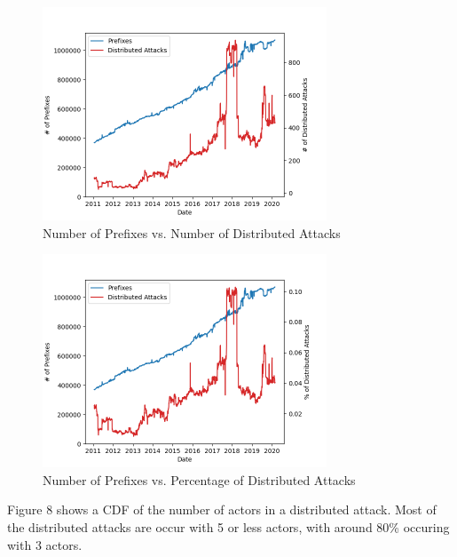 \begin{figure}[tp]
    \begin{center}
        \includegraphics[width=\textwidth, height=2.5in,
        keepaspectratio]{figures/distributed-and-unique-prefixes.png}
    \end{center}
    \caption{Number of Prefixes vs. Number of Distributed Attacks}
\end{figure}

\begin{figure}[tp]
    \begin{center}
        \includegraphics[width=\textwidth, height=2.5in,
        keepaspectratio]{figures/distributed-percs-and-unique-prefixes.png}
    \end{center}
    \caption{Number of Prefixes vs. Percentage of Distributed Attacks}
\end{figure}


Figure 8 shows a CDF of the number of actors in a distributed attack. Most of
the distributed attacks are occur with 5 or less actors, with around 80\%
occuring with 3 actors.

